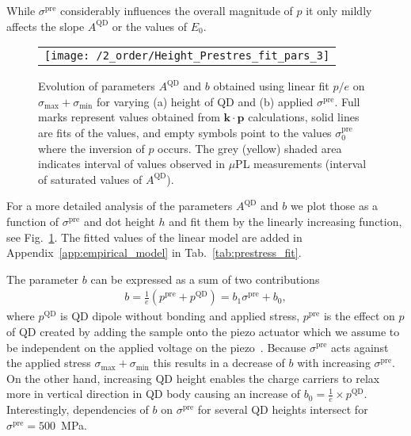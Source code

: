 While $\sigma^{\mathrm{pre}}$ considerably influences the overall magnitude of $p$ it only mildly affects the slope $A^{\mathrm{QD}}$ or the values of $E_0$.
%
%
%

\begin{figure}[!ht]
	\renewcommand{\tabcolsep}{2pt}
	\begin{center}
		\begin{tabular}{c}
			\texttt{[image: /2\_order/Height\_Prestres\_fit\_pars\_3]} \\
		\end{tabular}
	\end{center}
	\caption{Evolution of parameters $A^{\mathrm{QD}}$ and $b$ obtained using linear fit $p/e$ on $\sigma_{\mathrm{max}}+\sigma_{\mathrm{min}}$ for varying (a) height of QD and (b) applied $\sigma^{\mathrm{pre}}$. Full marks represent values obtained from $\mathbf{k\cdot p}$ calculations, solid lines are fits of the values, and empty symbols point to the values $\sigma^\mathrm{pre}_\mathrm{0}$ where the inversion of $p$ occurs. The grey (yellow) shaded area indicates interval of values observed in $\mu$PL measurements (interval of saturated values of $A^{\mathrm{QD}}$). 
		\label{fig:FitHeightPrestress}}
\end{figure}
%
For a more detailed analysis of the parameters $A^{\mathrm{QD}}$ and $b$ we plot those as a function of $\sigma^{\mathrm{pre}}$ and dot height $h$ and fit them by the linearly increasing function, see Fig.~\ref{fig:FitHeightPrestress}. The fitted values of the linear model are added in Appendix~\ref{app:empirical_model} in Tab.~\ref{tab:prestress_fit}.

The parameter $b$ can be expressed as a sum of two contributions
\begin{eqnarray}
b =\frac{1}{e} \left(p^\mathrm{pre} + p^\mathrm{QD}\right)=b_1\sigma^\mathrm{pre} +b_0,
\end{eqnarray} 
%
%
where $p^\mathrm{QD}$ is QD dipole without bonding and applied stress, $p^\mathrm{pre}$ is the effect on $p$ of QD created by adding the sample onto the piezo actuator which we assume to be independent on the applied voltage on the piezo~\cite{Aberl:17}. Because $\sigma^{\mathrm{pre}}$ acts against the applied stress $\sigma_{\mathrm{max}}+\sigma_{\mathrm{min}}$ this results in a decrease of $b$ with increasing $\sigma^\mathrm{pre}$. On the other hand, increasing QD height enables the charge carriers to relax more in vertical direction in QD body causing an increase of $b_0=\frac{1}{e}\times p^\mathrm{QD}$. Interestingly, dependencies of $b$ on $\sigma^\mathrm{pre}$ for several QD heights intersect for $\sigma^\mathrm{pre}=500$~MPa.

